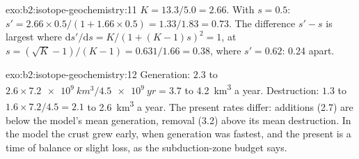 \begin{solution}{exo:b2:isotope-geochemistry:11}
$K = 13.3/5.0 = 2.66$. With $s = 0.5$: $s' = 2.66\times0.5/(1 + 1.66\times0.5) =
1.33/1.83 = 0.73$. The difference $s' - s$ is largest where
$\mathrm{d}s'/\mathrm{d}s = K/(1+(K-1)s)^2 = 1$, at $s = (\sqrt K - 1)/(K-1) =
0.631/1.66 = 0.38$, where $s' = 0.62$: 0.24 apart.
\end{solution}

\begin{solution}{exo:b2:isotope-geochemistry:12}
Generation: $2.3$ to $2.6\times\qty{7.2e9}{km^3}/\qty{4.5e9}{yr} = 3.7$ to
\qty{4.2}{km^3} a year. Destruction: $1.3$ to $1.6\times7.2/4.5 = 2.1$ to
\qty{2.6}{km^3} a year. The present rates differ: additions (2.7) are below the model's
mean generation, removal (3.2) above its mean destruction. In the model the crust grew
early, when generation was fastest, and the present is a time of balance or slight
loss, as the subduction-zone budget says.
\end{solution}

